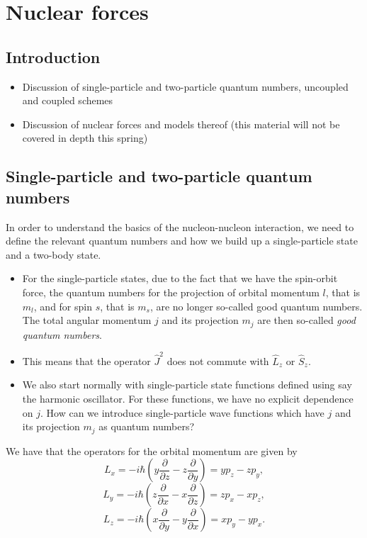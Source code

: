 \documentclass[graybox,sectrefs,envcountresetchap,open=right]{svmonodo}
\begin{document}
\chapter{Nuclear forces}
\label{ch:forces}

\section{Introduction}

\begin{itemize}
\item Discussion of single-particle and two-particle quantum numbers, uncoupled and coupled schemes

\item Discussion of nuclear forces and models thereof (this material will not be covered in depth this spring)
\end{itemize}

\noindent
\section{Single-particle and two-particle quantum numbers}
In order to understand the basics of the nucleon-nucleon interaction, we need to define the relevant quantum numbers and how we build up a single-particle state and a two-body state. 

\begin{itemize}
\item For the single-particle states, due to the fact that we have the spin-orbit force, the quantum numbers for the projection of orbital momentum $l$, that is $m_l$, and for spin $s$, that is $m_s$, are no longer so-called good quantum numbers. The total angular momentum $j$ and its projection $m_j$ are then  so-called \emph{good quantum numbers}.

\item This means that the operator $\hat{J}^2$ does not commute with $\hat{L}_z$  or $\hat{S}_z$.  

\item We also start normally with single-particle state functions defined using say the harmonic oscillator. For these functions, we have no explicit dependence on $j$. How can we introduce single-particle wave functions which have $j$ and its projection $m_j$ as quantum numbers? 
\end{itemize}

\noindent
We have that the operators for the orbital momentum are given by
\[
L_x=-i\hbar(y\frac{\partial }{\partial z}-z\frac{\partial }{\partial y})=
yp_z-zp_y,
\]
\[
L_y=-i\hbar(z\frac{\partial }{\partial x}-x\frac{\partial }{\partial z})= zp_x-xp_z,
\]
\[
L_z=-i\hbar(x\frac{\partial }{\partial y}-y\frac{\partial }{\partial x})=xp_y-yp_x.
\]
\end{document}
